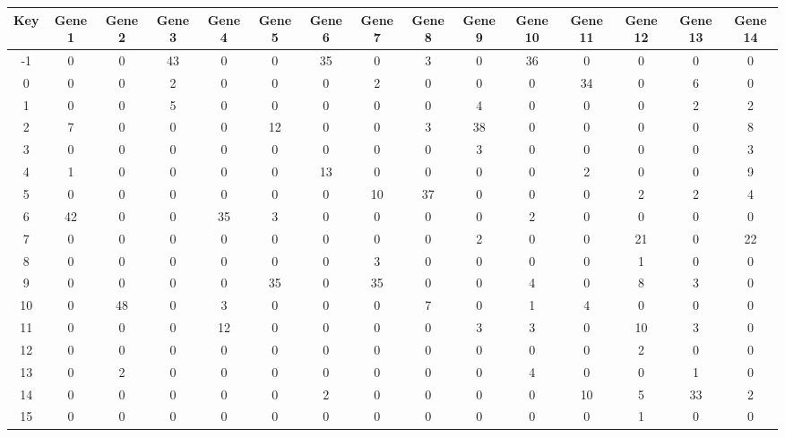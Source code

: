 \begin{tabular}{|c|c|c|c|c|c|c|c|c|c|c|c|c|c|c|}
\hline
Key & Gene 1 & Gene 2 & Gene 3 & Gene 4 & Gene 5 & Gene 6 & Gene 7 & Gene 8 & Gene 9 & Gene 10 & Gene 11 & Gene 12 & Gene 13 & Gene 14 \\
\hline
-1 & 0 & 0 & 43 & 0 & 0 & 35 & 0 & 3 & 0 & 36 & 0 & 0 & 0 & 0 \\
0 & 0 & 0 & 2 & 0 & 0 & 0 & 2 & 0 & 0 & 0 & 34 & 0 & 6 & 0 \\
1 & 0 & 0 & 5 & 0 & 0 & 0 & 0 & 0 & 4 & 0 & 0 & 0 & 2 & 2 \\
2 & 7 & 0 & 0 & 0 & 12 & 0 & 0 & 3 & 38 & 0 & 0 & 0 & 0 & 8 \\
3 & 0 & 0 & 0 & 0 & 0 & 0 & 0 & 0 & 3 & 0 & 0 & 0 & 0 & 3 \\
4 & 1 & 0 & 0 & 0 & 0 & 13 & 0 & 0 & 0 & 0 & 2 & 0 & 0 & 9 \\
5 & 0 & 0 & 0 & 0 & 0 & 0 & 10 & 37 & 0 & 0 & 0 & 2 & 2 & 4 \\
6 & 42 & 0 & 0 & 35 & 3 & 0 & 0 & 0 & 0 & 2 & 0 & 0 & 0 & 0 \\
7 & 0 & 0 & 0 & 0 & 0 & 0 & 0 & 0 & 2 & 0 & 0 & 21 & 0 & 22 \\
8 & 0 & 0 & 0 & 0 & 0 & 0 & 3 & 0 & 0 & 0 & 0 & 1 & 0 & 0 \\
9 & 0 & 0 & 0 & 0 & 35 & 0 & 35 & 0 & 0 & 4 & 0 & 8 & 3 & 0 \\
10 & 0 & 48 & 0 & 3 & 0 & 0 & 0 & 7 & 0 & 1 & 4 & 0 & 0 & 0 \\
11 & 0 & 0 & 0 & 12 & 0 & 0 & 0 & 0 & 3 & 3 & 0 & 10 & 3 & 0 \\
12 & 0 & 0 & 0 & 0 & 0 & 0 & 0 & 0 & 0 & 0 & 0 & 2 & 0 & 0 \\
13 & 0 & 2 & 0 & 0 & 0 & 0 & 0 & 0 & 0 & 4 & 0 & 0 & 1 & 0 \\
14 & 0 & 0 & 0 & 0 & 0 & 2 & 0 & 0 & 0 & 0 & 10 & 5 & 33 & 2 \\
15 & 0 & 0 & 0 & 0 & 0 & 0 & 0 & 0 & 0 & 0 & 0 & 1 & 0 & 0 \\
\hline
\end{tabular}